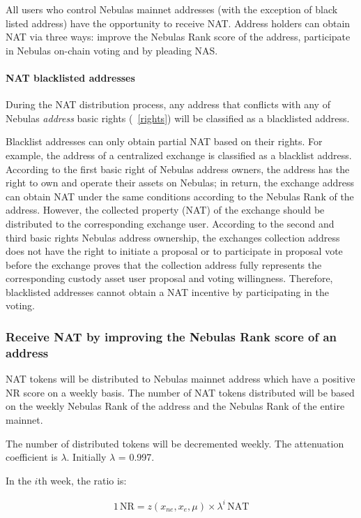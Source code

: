 All users who control Nebulas mainnet addresses (with the exception of black listed address) have the opportunity to receive NAT. Address holders can obtain NAT via three ways: improve the Nebulas Rank score of the address, participate in Nebulas on-chain voting and by pleading NAS.

\paragraph{NAT blacklisted addresses}

During the NAT distribution process, any address that conflicts with any of
Nebulas \emph{address} basic rights (~\ref{rights}) will be classified as a blacklisted address.

Blacklist addresses can only obtain partial NAT based on their rights. For example, the address of a centralized exchange is classified as a blacklist address. According to the first basic right of Nebulas address owners, the address has the right to own and operate their assets on Nebulas; in return, the exchange address can obtain NAT under the same conditions according to the Nebulas Rank of the address. However, the collected property (NAT) of the exchange should be distributed to the corresponding exchange user. According to the second and third basic rights Nebulas address ownership, the exchanges collection address does not have the right to initiate a proposal or to participate in proposal vote before the exchange proves that the collection address fully represents the corresponding custody asset user proposal and voting willingness. Therefore, blacklisted addresses cannot obtain a NAT incentive by participating in the voting.

\subsubsection{Receive NAT by improving the Nebulas Rank score of an address}

NAT tokens will be distributed to Nebulas mainnet address which have a positive NR score on a weekly basis. The number of NAT tokens distributed will be based on the weekly Nebulas Rank of the address and the Nebulas Rank of the entire mainnet.

The number of distributed tokens will be decremented weekly. The attenuation coefficient is $\lambda$. Initially $\lambda$ = 0.997.

In the $i$th week, the ratio is:

\begin{align}
1\,\text{NR}=z(x_{ne},x_{e},\mu)\times\lambda^{i}\,\text{NAT}
\end{align}

